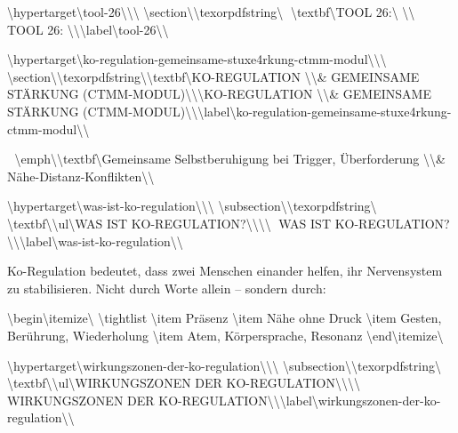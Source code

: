\textbackslash{}hypertarget\textbackslash{}{tool-26\textbackslash{}}\textbackslash{}{\textbackslash{}%
\textbackslash{}section\textbackslash{}{\textbackslash{}texorpdfstring\textbackslash{}{🧠 \textbackslash{}textbf\textbackslash{}{TOOL 26:\textbackslash{}} \textbackslash{}}\textbackslash{}{🧠 TOOL 26: \textbackslash{}}\textbackslash{}}\textbackslash{}label\textbackslash{}{tool-26\textbackslash{}}\textbackslash{}}

\textbackslash{}hypertarget\textbackslash{}{ko-regulation-gemeinsame-stuxe4rkung-ctmm-modul\textbackslash{}}\textbackslash{}{\textbackslash{}%
\textbackslash{}section\textbackslash{}{\textbackslash{}texorpdfstring\textbackslash{}{\textbackslash{}textbf\textbackslash{}{KO-REGULATION \textbackslash{}\textbackslash{}& GEMEINSAME STÄRKUNG (CTMM-MODUL)\textbackslash{}}\textbackslash{}}\textbackslash{}{KO-REGULATION \textbackslash{}\textbackslash{}& GEMEINSAME STÄRKUNG (CTMM-MODUL)\textbackslash{}}\textbackslash{}}\textbackslash{}label\textbackslash{}{ko-regulation-gemeinsame-stuxe4rkung-ctmm-modul\textbackslash{}}\textbackslash{}}

🧩 \textbackslash{}emph\textbackslash{}{\textbackslash{}textbf\textbackslash{}{Gemeinsame Selbstberuhigung bei Trigger, Überforderung \textbackslash{}\textbackslash{}& Nähe-Distanz-Konflikten\textbackslash{}}\textbackslash{}}

\textbackslash{}hypertarget\textbackslash{}{was-ist-ko-regulation\textbackslash{}}\textbackslash{}{\textbackslash{}%
\textbackslash{}subsection\textbackslash{}{\textbackslash{}texorpdfstring\textbackslash{}{🤝 \textbackslash{}textbf\textbackslash{}{\textbackslash{}ul\textbackslash{}{WAS IST KO-REGULATION?\textbackslash{}}\textbackslash{}}\textbackslash{}}\textbackslash{}{🤝 WAS IST KO-REGULATION?\textbackslash{}}\textbackslash{}}\textbackslash{}label\textbackslash{}{was-ist-ko-regulation\textbackslash{}}\textbackslash{}}

Ko-Regulation bedeutet, dass zwei Menschen einander helfen, ihr Nervensystem zu stabilisieren. Nicht durch Worte allein -- sondern durch:

\textbackslash{}begin\textbackslash{}{itemize\textbackslash{}}
\textbackslash{}tightlist
\textbackslash{}item
  Präsenz
\textbackslash{}item
  Nähe ohne Druck
\textbackslash{}item
  Gesten, Berührung, Wiederholung
\textbackslash{}item
  Atem, Körpersprache, Resonanz
\textbackslash{}end\textbackslash{}{itemize\textbackslash{}}

\textbackslash{}hypertarget\textbackslash{}{wirkungszonen-der-ko-regulation\textbackslash{}}\textbackslash{}{\textbackslash{}%
\textbackslash{}subsection\textbackslash{}{\textbackslash{}texorpdfstring\textbackslash{}{💞 \textbackslash{}textbf\textbackslash{}{\textbackslash{}ul\textbackslash{}{WIRKUNGSZONEN DER KO-REGULATION\textbackslash{}}\textbackslash{}}\textbackslash{}}\textbackslash{}{💞 WIRKUNGSZONEN DER KO-REGULATION\textbackslash{}}\textbackslash{}}\textbackslash{}label\textbackslash{}{wirkungszonen-der-ko-regulation\textbackslash{}}\textbackslash{}}

